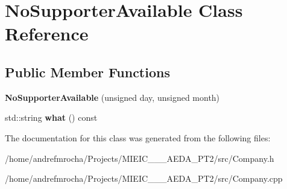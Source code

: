 \hypertarget{class_no_supporter_available}{}\section{No\+Supporter\+Available Class Reference}
\label{class_no_supporter_available}
\subsection*{Public Member Functions}
\begin{DoxyCompactItemize}
\item 
\mbox{\label{class_no_supporter_available_a9ae24112521420a3415c1479dbb66489}} 
{\bfseries No\+Supporter\+Available} (unsigned day, unsigned month)
\item 
\mbox{\label{class_no_supporter_available_a5b60aaf2c8a93091e454bcd7637e4391}} 
std\+::string {\bfseries what} () const
\end{DoxyCompactItemize}


The documentation for this class was generated from the following files\+:\begin{DoxyCompactItemize}
\item 
/home/andrefmrocha/\+Projects/\+M\+I\+E\+I\+C\+\_\+\_\+\_\+\+A\+E\+D\+A\+\_\+\+P\+T2/src/Company.\+h\item 
/home/andrefmrocha/\+Projects/\+M\+I\+E\+I\+C\+\_\+\_\+\_\+\+A\+E\+D\+A\+\_\+\+P\+T2/src/Company.\+cpp\end{DoxyCompactItemize}
